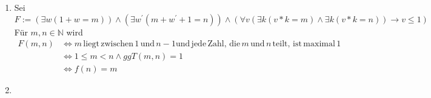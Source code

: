 \documentclass[12pt]{scrartcl}
\begin{document}
\exercise{}
\begin{enumerate}
  \item Sei \small{$F:= (\exists w(1+w=m)) \wedge (\exists w^{'}(m+w^{'}+1=n)) \wedge (\forall v(\exists k(v*k=m) \wedge \exists k(v*k=n)) \rightarrow v \leq 1)$}\\
  
        Für $m, n \in \mathbb{N}$ wird 
        \begin{align*}
          F(m, n) &\Longleftrightarrow m \, \mathrm{liegt \, zwischen \, 1 \, und} \,n-1 \mathrm{und \, jede \, Zahl, \,die} \, m \, \mathrm{und}\, n\, \mathrm{teilt, \,ist\, maximal} \, 1\\
                  &\Longleftrightarrow 1 \leq m < n \wedge ggT(m,n) = 1\\
                  &\Longleftrightarrow f(n)=m
        \end{align*}
  \item 
\end{enumerate}
\end{document}
